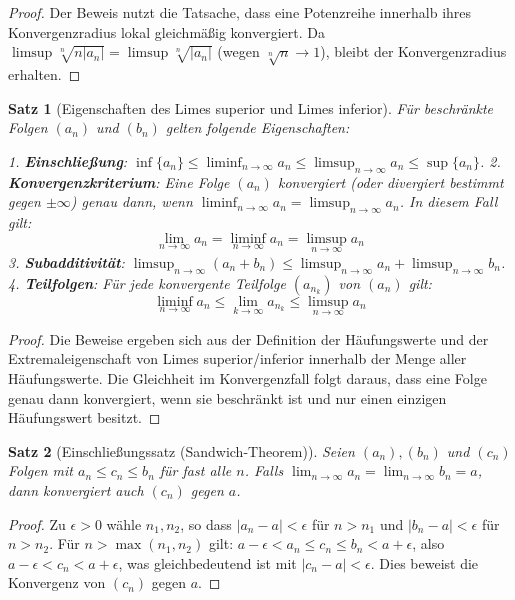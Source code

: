 \documentclass{article}
\newtheorem{satz}{Satz}[section]
\theoremstyle{definition}
\begin{document}
\begin{proof}
Der Beweis nutzt die Tatsache, dass eine Potenzreihe innerhalb ihres Konvergenzradius lokal gleichmäßig konvergiert. Da $\limsup \sqrt[n]{n|a_n|} = \limsup \sqrt[n]{|a_n|}$ (wegen $\sqrt[n]{n} \to 1$), bleibt der Konvergenzradius erhalten.
\end{proof}
\begin{satz}[Eigenschaften des Limes superior und Limes inferior]
Für beschränkte Folgen $(a_n)$ und $(b_n)$ gelten folgende Eigenschaften:

1. \textbf{Einschließung}: $\inf \{a_n\} \le \liminf_{n \to \infty} a_n \le \limsup_{n \to \infty} a_n \le \sup \{a_n\}$.
2. \textbf{Konvergenzkriterium}: Eine Folge $(a_n)$ konvergiert (oder divergiert bestimmt gegen $\pm\infty$) genau dann, wenn $\liminf_{n \to \infty} a_n = \limsup_{n \to \infty} a_n$. In diesem Fall gilt:
   $$\lim_{n \to \infty} a_n = \liminf_{n \to \infty} a_n = \limsup_{n \to \infty} a_n$$
3. \textbf{Subadditivität}: $\limsup_{n \to \infty} (a_n + b_n) \le \limsup_{n \to \infty} a_n + \limsup_{n \to \infty} b_n$.
4. \textbf{Teilfolgen}: Für jede konvergente Teilfolge $(a_{n_k})$ von $(a_n)$ gilt:
   $$\liminf_{n \to \infty} a_n \le \lim_{k \to \infty} a_{n_k} \le \limsup_{n \to \infty} a_n$$


\end{satz}
\begin{proof}
Die Beweise ergeben sich aus der Definition der Häufungswerte und der Extremaleigenschaft von Limes superior/inferior innerhalb der Menge aller Häufungswerte. Die Gleichheit im Konvergenzfall folgt daraus, dass eine Folge genau dann konvergiert, wenn sie beschränkt ist und nur einen einzigen Häufungswert besitzt.
\end{proof}
\begin{satz}[Einschließungssatz (Sandwich-Theorem)]
Seien $(a_n), (b_n)$ und $(c_n)$ Folgen mit $a_n \le c_n \le b_n$ für fast alle $n$. Falls $\lim_{n \to \infty} a_n = \lim_{n \to \infty} b_n = a$, dann konvergiert auch $(c_n)$ gegen $a$.


\end{satz}
\begin{proof}
Zu $\epsilon > 0$ wähle $n_1, n_2$, so dass $|a_n - a| < \epsilon$ für $n > n_1$ und $|b_n - a| < \epsilon$ für $n > n_2$. Für $n > \max(n_1, n_2)$ gilt:
$a - \epsilon < a_n \le c_n \le b_n < a + \epsilon$,
also $a - \epsilon < c_n < a + \epsilon$, was gleichbedeutend ist mit $|c_n - a| < \epsilon$.
Dies beweist die Konvergenz von $(c_n)$ gegen $a$.
\end{proof}
\end{document}

